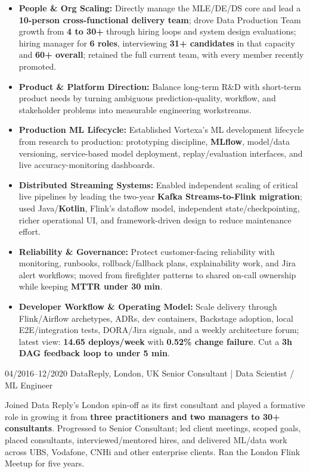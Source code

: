 \documentclass[]{../../friggeri-cv}
\begin{document}
\begin{entrylist}
{{    	}
	    \begin{itemize}[leftmargin=1.1em]
										        \item \footnotesize\textbf{People \& Org Scaling:} Directly manage the MLE/DE/DS core and lead a \textbf{10-person cross-functional delivery team}; drove Data Production Team growth from \textbf{4 to 30+} through hiring loops and system design evaluations; hiring manager for \textbf{6 roles}, interviewing \textbf{31+ candidates} in that capacity and \textbf{60+ overall}; retained the full current team, with every member recently promoted.
										        \item \footnotesize\textbf{Product \& Platform Direction:} Balance long-term R\&D with short-term product needs by turning ambiguous prediction-quality, workflow, and stakeholder problems into measurable engineering workstreams.
										        \item \footnotesize\textbf{Production ML Lifecycle:} Established Vortexa's ML development lifecycle from research to production: prototyping discipline, \textbf{MLflow}, model/data versioning, service-based model deployment, replay/evaluation interfaces, and live accuracy-monitoring dashboards.
										        \item \footnotesize\textbf{Distributed Streaming Systems:} Enabled independent scaling of critical live pipelines by leading the two-year \textbf{Kafka Streams-to-Flink migration}; used Java/\textbf{Kotlin}, Flink's dataflow model, independent state/checkpointing, richer operational UI, and framework-driven design to reduce maintenance effort.
										        \item \footnotesize\textbf{Reliability \& Governance:} Protect customer-facing reliability with monitoring, runbooks, rollback/fallback plans, explainability work, and Jira alert workflows; moved from firefighter patterns to shared on-call ownership while keeping \textbf{MTTR under 30 min}.
										        \item \footnotesize\textbf{Developer Workflow \& Operating Model:} Scale delivery through Flink/Airflow archetypes, ADRs, dev containers, Backstage adoption, local E2E/integration tests, DORA/Jira signals, and a weekly architecture forum; latest view: \textbf{14.65 deploys/week} with \textbf{0.52\% change failure}. Cut a \textbf{3h DAG feedback loop to under 5 min}.
    	\end{itemize}
	}
    \entry
    {04/2016–12/2020}
    {DataReply, London, UK}
    {Senior Consultant | Data Scientist / ML Engineer}
    {
        {\small
        \setlength{\parindent}{0pt}
        \setlength{\leftskip}{0pt}
					        Joined Data Reply's London spin-off as its first consultant and played a formative role in growing it from \textbf{three practitioners and two managers to 30+ consultants}. Progressed to Senior Consultant; led client meetings, scoped goals, placed consultants, interviewed/mentored hires, and delivered ML/data work across UBS, Vodafone, CNHi and other enterprise clients. Ran the London Flink Meetup for five years.

}}
\end{entrylist}
\end{document}
